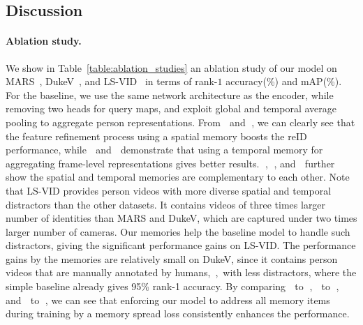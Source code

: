 \documentclass[10pt,twocolumn,letterpaper]{article}
\begin{document}
		
	\subsection{Discussion} \label{subsec:discussion}
	\vspace{-0.1cm}
	
		\paragraph{Ablation study.}

			We show in Table~\ref{table:ablation_studies} an ablation study of our model on MARS~\cite{zheng2016mars}, DukeV~\cite{wu2018exploit}, and LS-VID~\cite{li2019global} in terms of rank-$1$ accuracy(\%) and mAP(\%). For the baseline, we use the same network architecture as the encoder, while removing two heads for query maps, and exploit global and temporal average pooling to aggregate person representations. From \textcircled{\raisebox{-0.9pt}{1}} and \textcircled{\raisebox{-0.9pt}{3}}, we can clearly see that the feature refinement process using a spatial memory boosts the reID performance, while \textcircled{\raisebox{-0.9pt}{1}} and \textcircled{\raisebox{-0.9pt}{5}} demonstrate that using a temporal memory for aggregating frame-level representations gives better results. \textcircled{\raisebox{-0.9pt}{3}}, \textcircled{\raisebox{-0.9pt}{5}}, and \textcircled{\raisebox{-0.9pt}{7}} further show the spatial and temporal memories are complementary to each other. Note that LS-VID provides person videos with more diverse spatial and temporal distractors than the other datasets. It contains videos of three times larger number of identities than MARS and DukeV, which are captured under two times larger number of cameras. Our memories help the baseline model to handle such distractors, giving the significant performance gains on LS-VID. The performance gains by the memories are relatively small on DukeV, since it contains person videos that are manually annotated by humans,~\ie,~with less distractors, where the simple baseline already gives 95\% rank-1 accuracy. By comparing \textcircled{\raisebox{-0.9pt}{2}} to \textcircled{\raisebox{-0.9pt}{3}}, \textcircled{\raisebox{-0.9pt}{4}} to \textcircled{\raisebox{-0.9pt}{5}}, and \textcircled{\raisebox{-0.9pt}{6}} to \textcircled{\raisebox{-0.9pt}{7}}, we can see that enforcing our model to address all memory items during training by a memory spread loss consistently enhances the performance.
						
\end{document}

